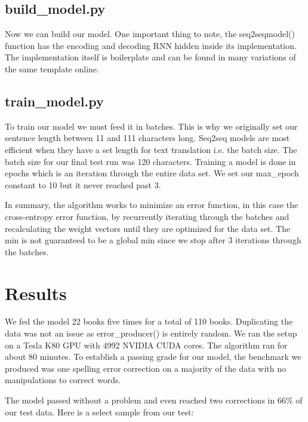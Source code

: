 \documentclass[11pt,a4paper]{scrartcl}
\theoremstyle{definition}
\begin{document}
\subsection{build\_model.py}
Now we can build our model. One important thing to note, the seq2seqmodel() function has the encoding and decoding RNN hidden inside its implementation. The implementation itself is boilerplate and can be found in many variations of the same template online.

\vspace{1em}
\subsection{train\_model.py}
To train our model we must feed it in batches. This is why we originally set our sentence length between 11 and 111 characters long. Seq2seq models are most efficient when they have a set length for text translation i.e. the batch size. The batch size for our final test run was 120 characters. Training a model is done in epochs which is an iteration through the entire data set. We set our max\_epoch constant to 10 but it never reached past 3.\newline


\vspace{1em}
In summary, the algorithm works to minimize an error function, in this case the cross-entropy error function, by recurrently iterating through the batches and recalculating the weight vectors until they are optimized for the data set. The min is not guaranteed to be a global min since we stop after 3 iterations through the batches.

\section{Results}
We fed the model 22 books five times for a total of 110 books. Duplicating the data was not an issue as error\_producer() is entirely random. We ran the setup on a Tesla K80 GPU with 4992 NVIDIA CUDA cores. The algorithm ran for about 80 minutes. To establish a passing grade for our model, the benchmark we produced was one spelling error correction on a majority of the data with no manipulations to correct words.\newline

The model passed without a problem and even reached two corrections in 66\% of our test data. Here is a select sample from our test:
\end{document}
